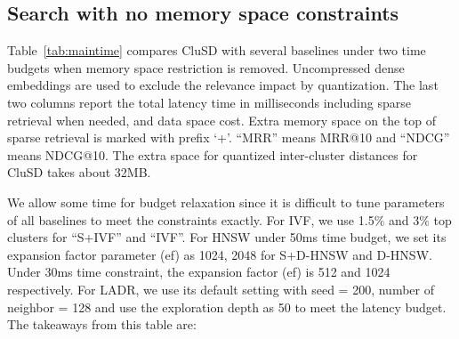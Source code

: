 


\subsection{Search with no memory space constraints}
\label{sect:evaltimebudget}
Table~\ref{tab:maintime} compares  CluSD with  several baselines under two time budgets when memory space restriction is removed.
Uncompressed dense embeddings  are used to exclude the relevance impact by quantization.
The last two columns report the total latency time in milliseconds including sparse retrieval when needed,
and data space cost. Extra memory space on the top of sparse retrieval is marked with prefix `+'. 
``MRR'' means  MRR@10 and ``NDCG'' means  NDCG@10.
The extra space for quantized inter-cluster distances for CluSD takes about 32MB. 

We allow some time for budget relaxation since it is difficult to tune parameters of all baselines to meet the constraints exactly. 
For IVF, we use 1.5$\%$ and 3$\%$ top clusters for ``S+IVF'' and ``IVF''.
For HNSW under 50ms time budget, we set its expansion factor parameter (ef) as 1024, 
2048 for S$+$D-HNSW and D-HNSW. 
Under 30ms time constraint, the expansion factor (ef) is  512 and  1024 respectively. 
For LADR, we use its default setting with seed = 200, number of neighbor = 128 and use the exploration depth as  50 to meet the latency budget.
The takeaways from this table are:

